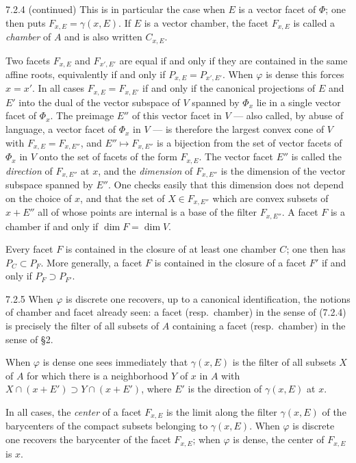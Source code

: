 \documentclass[12pt,a4paper,oneside,english]{smfart}
\theoremstyle{definition}
\theoremstyle{bt}
\begin{document}
\begin{btpar}{7.2.4 (continued)}
This is in particular the case when $E$ is a vector facet of $\Phi$; one
then puts $F_{x,E}=\gamma(x,E)$. If $E$ is a vector chamber, the facet
$F_{x,E}$ is called a \emph{chamber} of $A$ and is also written
$C_{x,E}$.

Two facets $F_{x,E}$ and $F_{x',E'}$ are equal if and only if they are
contained in the same affine roots, equivalently if and only if
$P_{x,E}=P_{x',E'}$. When $\varphi$ is dense this forces $x=x'$. In all
cases $F_{x,E}=F_{x,E'}$ if and only if the canonical projections of $E$
and $E'$ into the dual of the vector subspace of $V$ spanned by $\Phi_x$
lie in a single vector facet of $\Phi_x$. The preimage $E''$ of this
vector facet in $V$ --- also called, by abuse of language, a vector facet
of $\Phi_x$ in $V$ --- is therefore the largest convex cone of $V$ with
$F_{x,E}=F_{x,E''}$, and $E''\mapsto F_{x,E''}$ is a bijection from the
set of vector facets of $\Phi_x$ in $V$ onto the set of facets of the
form $F_{x,E}$. The vector facet $E''$ is called the \emph{direction} of
$F_{x,E''}$ at $x$, and the \emph{dimension} of $F_{x,E''}$ is the
dimension of the vector subspace spanned by $E''$. One checks easily
that this dimension does not depend on the choice of $x$, and that the
set of $X\in F_{x,E''}$ which are convex subsets of $x+E''$ all of whose
points are internal is a base of the filter $F_{x,E''}$. A facet $F$ is
a chamber if and only if $\dim F=\dim V$.

Every facet $F$ is contained in the closure of at least one chamber $C$;
one then has $P_C\subset P_F$. More generally, a facet $F$ is contained
in the closure of a facet $F'$ if and only if $P_F\supset P_{F'}$.
\end{btpar}

\begin{btpar}{7.2.5}
When $\varphi$ is discrete one recovers, up to a canonical
identification, the notions of chamber and facet already seen: a facet
(resp.\ chamber) in the sense of (7.2.4) is precisely the filter of all
subsets of $A$ containing a facet (resp.\ chamber) in the sense of \S2.

When $\varphi$ is dense one sees immediately that $\gamma(x,E)$ is the
filter of all subsets $X$ of $A$ for which there is a neighborhood $Y$
of $x$ in $A$ with $X\cap(x+E')\supset Y\cap(x+E')$, where $E'$ is the
direction of $\gamma(x,E)$ at $x$.

In all cases, the \emph{center} of a facet $F_{x,E}$ is the limit along
the filter $\gamma(x,E)$ of the barycenters of the compact subsets
belonging to $\gamma(x,E)$. When $\varphi$ is discrete one recovers the
barycenter of the facet $F_{x,E}$; when $\varphi$ is dense, the center of
$F_{x,E}$ is $x$.
\end{btpar}
\end{document}
